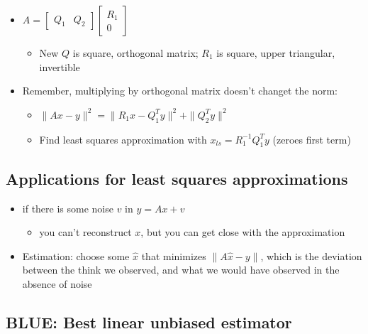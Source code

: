 \documentclass[10pt,letterpaper]{article}
\begin{document}
\begin{itemize}
\item $A= \begin{bmatrix}Q_1 & Q_2 \end{bmatrix} \begin{bmatrix} R_1 \\ 0 \end{bmatrix}$

\begin{itemize}
\item New $Q$ is square, orthogonal matrix; $R_1$ is square, upper triangular, invertible
\end{itemize}

\item Remember, multiplying by orthogonal matrix doesn't changet the norm:

\begin{itemize}
\item $\| A x-y \| ^{2} = \| R_1 x - Q ^{T} _{1} y \|^2 + \| Q ^{T} _{2} y \| ^{2}$
\item Find least squares approximation with $x _{ls} = R ^{-1} _{1} Q ^{T} _{1} y$ (zeroes first term)
\end{itemize}

\end{itemize}
\subsection{Applications for least squares approximations}
\label{sec-4_7}

\begin{itemize}
\item if there is some noise $v$ in $y = Ax+v$

\begin{itemize}
\item you can't reconstruct $x$, but you can get close with the approximation
\end{itemize}

\item Estimation: choose some $\hat x$ that minimizes $\| A \hat x - y\|$, which is the deviation between the think we observed, and what we would have observed in the absence of noise
\end{itemize}
\subsection{BLUE: Best linear unbiased estimator}
\label{sec-4_8}
\end{document}
